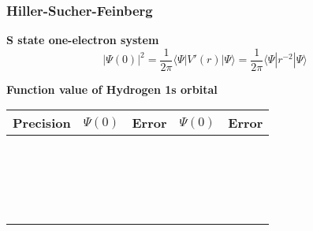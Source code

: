 \begin{frame}
\frametitle{Hiller-Sucher-Feinberg}
\centering
\textbf{S state one-electron system}
\begin{equation}
    \nonumber
    |\Psi(0)|^2 = \frac{1}{2\pi}\langle\Psi|V'(r)|\Psi\rangle
                = \frac{1}{2\pi}\langle\Psi|r^{-2}|\Psi\rangle
\end{equation}
\begin{table}
\textbf{Function value of Hydrogen 1s orbital}
\begin{tabular}{cclcl}
\hline
\hline
\multicolumn{1}{c}{\textbf{Precision}}&
\multicolumn{1}{c}{$\Psi(0)$}&
\multicolumn{1}{l}{Error}&
\multicolumn{1}{c}{$\Psi(0)$}&
\multicolumn{1}{l}{Error}\\
\hline
\hspace{10mm}\ &\hspace{25mm}\     &\hspace{15mm}\ &\hspace{25mm}\      &\hspace{10mm}\ \\
&
\multicolumn{2}{c}{}&
\multicolumn{2}{c}{}\\
\hspace{10mm}\ &\hspace{25mm}\     &\hspace{15mm}\ &\hspace{25mm}\      &\hspace{10mm}\ \\
               &                   &               &                    &               \\
               &                   &               &                    &               \\
               &                   &               &                    &               \\
               &                   &               &                    &               \\
               &                   &               &                    &               \\
               &                   &               &                    &               \\
               &                   &               &                    &               \\
               &                   &               &                    &               \\
\hline
\hline
\end{tabular}
\end{table}
\end{frame}

